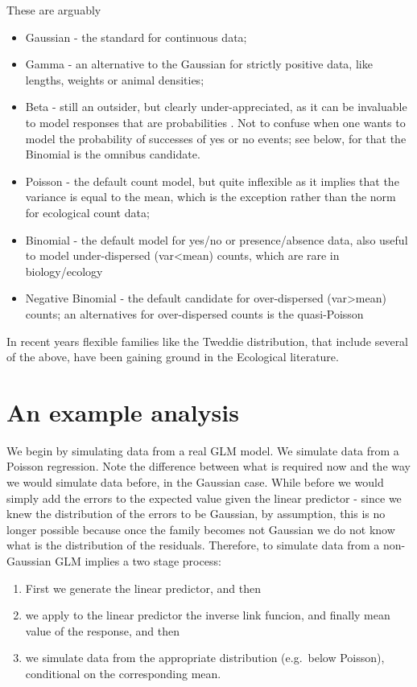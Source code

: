 \documentclass[
]{book}
\providecommand{\tightlist}{%
  \setlength{\itemsep}{0pt}\setlength{\parskip}{0pt}}
\begin{document}
These are arguably

\begin{itemize}
\tightlist
\item
  Gaussian - the standard for continuous data;
\item
  Gamma - an alternative to the Gaussian for strictly positive data, like lengths, weights or animal densities;
\item
  Beta - still an outsider, but clearly under-appreciated, as it can be invaluable to model responses that are probabilities \citep{Douma2019}. Not to confuse when one wants to model the probability of successes of yes or no events; see below, for that the Binomial is the omnibus candidate.
\item
  Poisson - the default count model, but quite inflexible as it implies that the variance is equal to the mean, which is the exception rather than the norm for ecological count data;
\item
  Binomial - the default model for yes/no or presence/absence data, also useful to model under-dispersed (var\textless mean) counts, which are rare in biology/ecology
\item
  Negative Binomial - the default candidate for over-dispersed (var\textgreater mean) counts; an alternatives for over-dispersed counts is the quasi-Poisson \citep{Hoef2007}
\end{itemize}

In recent years flexible families like the Tweddie distribution, that include several of the above, have been gaining ground in the Ecological literature.

\hypertarget{an-example-analysis}{%
\section{An example analysis}\label{an-example-analysis}}

We begin by simulating data from a real GLM model. We simulate data from a Poisson regression. Note the difference between what is required now and the way we would simulate data before, in the Gaussian case. While before we would simply add the errors to the expected value given the linear predictor - since we knew the distribution of the errors to be Gaussian, by assumption, this is no longer possible because once the family becomes not Gaussian we do not know what is the distribution of the residuals. Therefore, to simulate data from a non-Gaussian GLM implies a two stage process:

\begin{enumerate}
\def\labelenumi{\arabic{enumi}.}
\tightlist
\item
  First we generate the linear predictor, and then
\item
  we apply to the linear predictor the inverse link funcion, and finally
  mean value of the response, and then
\item
  we simulate data from the appropriate distribution (e.g.~below Poisson), conditional on the corresponding mean.
\end{enumerate}
\end{document}
